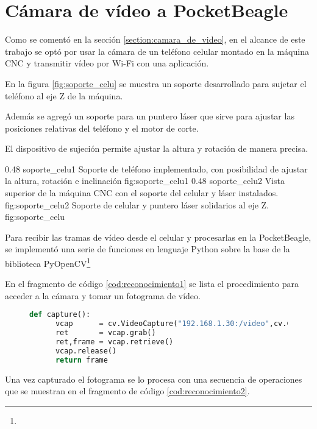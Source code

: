 \section{Cámara de vídeo a PocketBeagle}
Como se comentó en la sección \ref{section:camara_de_video}, en el alcance de este trabajo se optó por usar la cámara de un teléfono celular montado en la máquina CNC y transmitir vídeo por Wi-Fi con una aplicación.\par
   En la figura \ref{fig:soporte_celu} se muestra un soporte desarrollado para sujetar el teléfono al eje Z de la máquina. \par
   Además se agregó un soporte para un puntero láser que sirve para ajustar las posiciones relativas del teléfono y el motor de corte.\par
   El dispositivo de sujeción permite ajustar la altura y rotación de manera precisa.\par

\subfigab 
{0.48} {soporte_celu1} {Soporte de teléfono implementado, con posibilidad de ajustar la altura, rotación e inclinación} {fig:soporte_celu1}
{0.48} {soporte_celu2} {Vista superior de la máquina CNC con el soporte del celular y láser instalados.\\ \vphantom{1}}{fig:soporte_celu2}
      {Soporte de celular y puntero láser solidarios al eje Z.}
      {fig:soporte_celu}

      Para recibir las tramas de vídeo desde el celular y procesarlas en la PocketBeagle, se implementó una serie de funciones en lenguaje Python sobre la base de la biblioteca PyOpenCV\footnote{\pyopencvlink}\par
   En el fragmento de código \ref{cod:reconocimiento1} se lista el procedimiento para acceder a la cámara y tomar un fotograma de vídeo.\par

\begin{figure}[h]
   \begin{lstlisting}[language=python,caption={Conexión a la cámara del teléfono por Wi-Fi y captura de un fotograma para su posterior procesamiento.},label={cod:reconocimiento1}]
   def capture():
      vcap      = cv.VideoCapture("192.168.1.30:/video",cv.CAP_FFMPEG);
      ret       = vcap.grab()
      ret,frame = vcap.retrieve()
      vcap.release()
      return frame
   \end{lstlisting}
\end{figure}

Una vez capturado el fotograma se lo procesa con una secuencia de operaciones que se muestran en el fragmento de código \ref{cod:reconocimiento2}.

